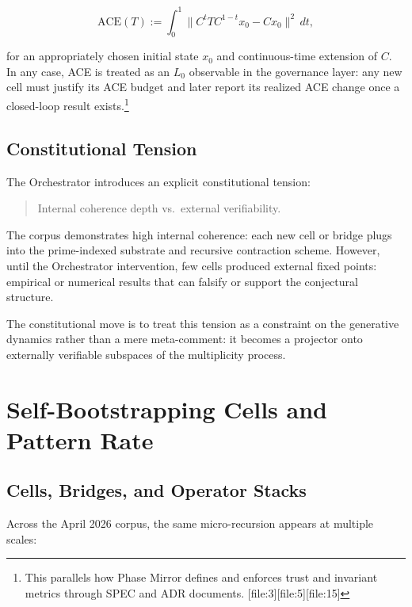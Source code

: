 \documentclass[11pt]{article}
\begin{document}
\[
\mathrm{ACE}(T) := \int_0^1 \| C^t T C^{1-t} x_0 - C x_0 \|^2 \, dt,
\]

for an appropriately chosen initial state \(x_0\) and continuous-time extension of \(C\). In any case, ACE is treated as an \(L_0\) observable in the governance layer: any new cell must justify its ACE budget and later report its realized ACE change once a closed-loop result exists.\footnote{This parallels how Phase Mirror defines and enforces trust and invariant metrics through SPEC and ADR documents. [file:3][file:5][file:15]}

\subsection{Constitutional Tension}

The Orchestrator introduces an explicit constitutional tension:

\begin{quote}
Internal coherence depth vs.\ external verifiability.
\end{quote}

The corpus demonstrates high internal coherence: each new cell or bridge plugs into the prime-indexed substrate and recursive contraction scheme. However, until the Orchestrator intervention, few cells produced external fixed points: empirical or numerical results that can falsify or support the conjectural structure.

The constitutional move is to treat this tension as a constraint on the generative dynamics rather than a mere meta-comment: it becomes a projector onto externally verifiable subspaces of the multiplicity process.

\newpage

\section{Self-Bootstrapping Cells and Pattern Rate}

\subsection{Cells, Bridges, and Operator Stacks}

Across the April 2026 corpus, the same micro-recursion appears at multiple scales:
\end{document}
